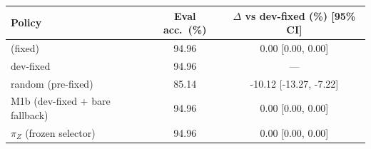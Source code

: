 \begin{tabular}{@{}lcc@{}}
\toprule
Policy & Eval acc.\ (\%) & $\Delta$ vs dev-fixed (\%) [95\% CI] \\
\midrule
\bare{} (fixed) & 94.96 & 0.00 [0.00, 0.00] \\
dev-fixed & 94.96 & --- \\
random (pre-fixed) & 85.14 & -10.12 [-13.27, -7.22] \\
M1b (dev-fixed + bare fallback) & 94.96 & 0.00 [0.00, 0.00] \\
$\pi_Z$ (frozen selector) & 94.96 & 0.00 [0.00, 0.00] \\
\bottomrule
\end{tabular}
